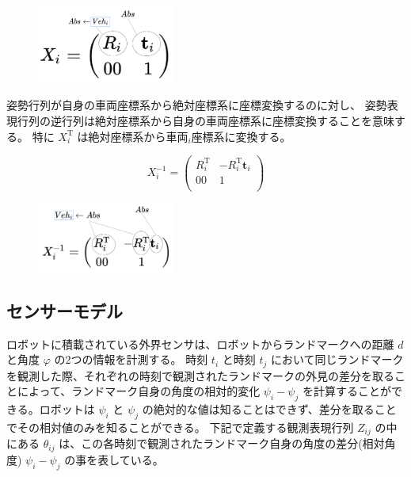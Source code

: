 \documentclass{article}
\begin{document}
\begin{figure}[h!]
  \centering
  \includegraphics[width=0.4\textwidth]{2-3_pose_representation_matrix.png}
\end{figure}

姿勢行列が自身の車両座標系から絶対座標系に座標変換するのに対し、
姿勢表現行列の逆行列は絶対座標系から自身の車両座標系に座標変換することを意味する。
特に $X_i^{\mathrm{T}}$ は絶対座標系から車両$_i$座標系に変換する。

\[
X_i^{-1} =
\left(
  \begin{array}{ccc}
    R_i^{\mathrm{T}} & -R_i^{\mathrm{T}}\bm{t}_i \\
                  00 &                           1 \\
  \end{array}
\right)
\]

\begin{figure}[h!]
  \centering
  \includegraphics[width=0.4\textwidth]{2-4_pose_representation_matrix_inverse.png}
\end{figure}

\newpage

\subsection{センサーモデル}

ロボットに積載されている外界センサは、ロボットからランドマークへの距離 $d$ と角度 $\varphi$ の2つの情報を計測する。
時刻 $t_i$ と時刻 $t_j$ において同じランドマークを観測した際、それぞれの時刻で観測されたランドマークの外見の差分を取ることによって、ランドマーク自身の角度の相対的変化 $\psi_i - \psi_j$ を計算することができる。ロボットは $\psi_i$ と $\psi_j$ の絶対的な値は知ることはできず、差分を取ることでその相対値のみを知ることができる。
下記で定義する観測表現行列 $Z_{ij}$ の中にある $\theta_{ij}$ は、この各時刻で観測されたランドマーク自身の角度の差分(相対角度) $\psi_i - \psi_j$ の事を表している。
\end{document}

